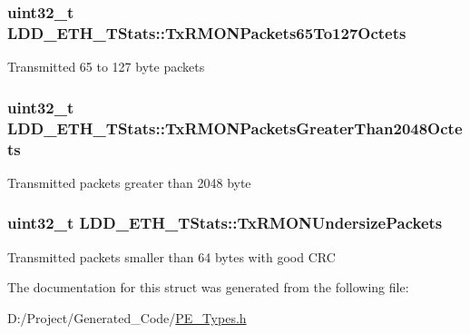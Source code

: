 \subsubsection[{Tx\+R\+M\+O\+N\+Packets65\+To127\+Octets}]{\setlength{\rightskip}{0pt plus 5cm}uint32\+\_\+t L\+D\+D\+\_\+\+E\+T\+H\+\_\+\+T\+Stats\+::\+Tx\+R\+M\+O\+N\+Packets65\+To127\+Octets}\label{struct_l_d_d___e_t_h___t_stats_afd6d14f52f7a9646e7a202abd30b4aea}
Transmitted 65 to 127 byte packets \hypertarget{struct_l_d_d___e_t_h___t_stats_a8f892961bd1e66bf6c75e6acec8d8816}{}
\subsubsection[{Tx\+R\+M\+O\+N\+Packets\+Greater\+Than2048\+Octets}]{\setlength{\rightskip}{0pt plus 5cm}uint32\+\_\+t L\+D\+D\+\_\+\+E\+T\+H\+\_\+\+T\+Stats\+::\+Tx\+R\+M\+O\+N\+Packets\+Greater\+Than2048\+Octets}\label{struct_l_d_d___e_t_h___t_stats_a8f892961bd1e66bf6c75e6acec8d8816}
Transmitted packets greater than 2048 byte \hypertarget{struct_l_d_d___e_t_h___t_stats_a71c3b9e66b78d20604a952804089a347}{}
\subsubsection[{Tx\+R\+M\+O\+N\+Undersize\+Packets}]{\setlength{\rightskip}{0pt plus 5cm}uint32\+\_\+t L\+D\+D\+\_\+\+E\+T\+H\+\_\+\+T\+Stats\+::\+Tx\+R\+M\+O\+N\+Undersize\+Packets}\label{struct_l_d_d___e_t_h___t_stats_a71c3b9e66b78d20604a952804089a347}
Transmitted packets smaller than 64 bytes with good C\+R\+C 

The documentation for this struct was generated from the following file\+:\begin{DoxyCompactItemize}
\item 
D\+:/\+Project/\+Generated\+\_\+\+Code/\hyperlink{_p_e___types_8h}{P\+E\+\_\+\+Types.\+h}\end{DoxyCompactItemize}
